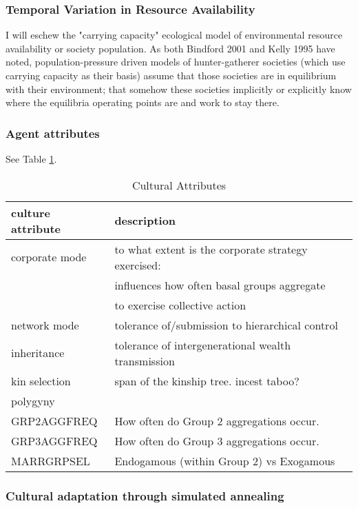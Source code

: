 \documentclass[11pt,oneside,a4paper,onecolumn]{article}
\begin{document}
\subsubsection{Temporal Variation in Resource Availability}

I will eschew the "carrying capacity" ecological model of environmental resource availability or society population.  As both Bindford 2001 and Kelly 1995 have noted, population-pressure driven models of hunter-gatherer societies (which use carrying capacity as their basis) assume that those societies are in equilibrium with their environment; that somehow these societies implicitly or explicitly know where the equilibria operating points are and work to stay there.  

\subsubsection{Agent attributes}
See Table \ref{tab:culture_attributes}.\\
\begin{table}[htp]
	\centering
	\begin{tabular}{|l|l|}
	\hline 
	\textbf{culture attribute} & \textbf{description} \\ 
	\hline 
	corporate mode & to what extent is the corporate strategy exercised:\\
	& influences how often basal groups aggregate\\
	& to exercise collective action \\ 
	\hline 
	network mode & tolerance of/submission to hierarchical control\\ 
	\hline
	inheritance & tolerance of intergenerational wealth transmission \\
	\hline
	kin selection & span of the kinship tree.  incest taboo? \\
	\hline
	polygyny &  \\
	\hline
	GRP2AGGFREQ & How often do Group 2 aggregations occur. \\ 
	\hline 
	GRP3AGGFREQ & How often do Group 3 aggregations occur. \\
	\hline
	MARRGRPSEL & Endogamous (within Group 2) vs Exogamous \\ 
	\hline 
	\end{tabular}
	\caption{Cultural Attributes} 
	\label{tab:culture_attributes}
\end{table}

\FloatBarrier

\subsubsection{Cultural adaptation through simulated annealing }  
\end{document}
